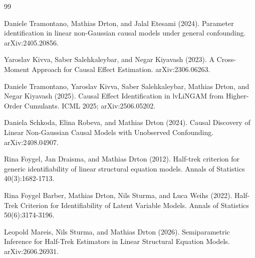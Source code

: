 \documentclass{article}
\begin{document}
\begin{thebibliography}{99}

   Daniele Tramontano, Mathias Drton, and Jalal Etesami (2024). Parameter identification in linear non-Gaussian causal models under general confounding. arXiv:2405.20856.

   Yaroslav Kivva, Saber Salehkaleybar, and Negar Kiyavash (2023). A Cross-Moment Approach for Causal Effect Estimation. arXiv:2306.06263.

   Daniele Tramontano, Yaroslav Kivva, Saber Salehkaleybar, Mathias Drton, and Negar Kiyavash (2025). Causal Effect Identification in lvLiNGAM from Higher-Order Cumulants. ICML 2025; arXiv:2506.05202.

   Daniela Schkoda, Elina Robeva, and Mathias Drton (2024). Causal Discovery of Linear Non-Gaussian Causal Models with Unobserved Confounding. arXiv:2408.04907.

   Rina Foygel, Jan Draisma, and Mathias Drton (2012). Half-trek criterion for generic identifiability of linear structural equation models. Annals of Statistics 40(3):1682-1713.

   Rina Foygel Barber, Mathias Drton, Nils Sturma, and Luca Weihs (2022). Half-Trek Criterion for Identifiability of Latent Variable Models. Annals of Statistics 50(6):3174-3196.

   Leopold Mareis, Nils Sturma, and Mathias Drton (2026). Semiparametric Inference for Half-Trek Estimators in Linear Structural Equation Models. arXiv:2606.26931.

\end{thebibliography}
\end{document}
